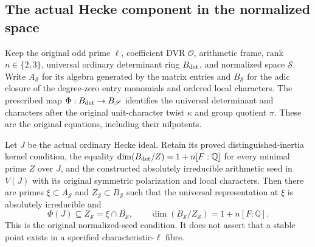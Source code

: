 \subsection{The actual Hecke component in the normalized space}
Keep the original odd prime $\ell$, coefficient DVR $\mathcal O$,
arithmetic frame, rank $n\in\{2,3\}$, universal ordinary determinant
ring $B_{\rm det}$, and normalized space $\mathscr S$. Write
$A_{\mathscr S}$ for its algebra generated by the matrix entries and
$B_{\mathscr S}$ for the adic closure of the degree-zero entry monomials
and ordered local characters. The prescribed map
$\Phi:B_{\rm det}\to B_{\mathscr S}$ identifies the universal
determinant and characters after the original unit-character twist
$\kappa$ and group quotient $\pi$. These are the original equations,
including their nilpotents.\cite{support-original-transfer}

\begin{theorem}\label{thm:selmer-support-seed-transfer}
Let $J$ be the actual ordinary Hecke ideal. Retain its proved
distinguished-inertia kernel condition, the equality
$\dim(B_{\rm det}/Z)=1+n[F:\mathbb Q]$ for every minimal prime
$Z$ over $J$, and the constructed absolutely irreducible arithmetic
seed in $V(J)$ with its original symmetric polarization and local
characters. Then there are primes
$\xi\subset A_{\mathscr S}$ and $Z_{\mathscr S}\subset B_{\mathscr S}$
such that the universal representation at $\xi$ is absolutely
irreducible and
\[
 \Phi(J)\subseteq Z_{\mathscr S}=\xi\cap B_{\mathscr S},
 \qquad
 \dim(B_{\mathscr S}/Z_{\mathscr S})=1+n[F:\mathbb Q].
\]
This is the original normalized-seed condition. It does not assert
that a stable point exists in a specified characteristic-$\ell$ fibre.
\end{theorem}

